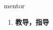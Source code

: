 
\begin{frame}
{\huge mentor}
\begin{center}
\begin{enumerate}\Large
  \item \textbf{教导，指导}
\end{enumerate}
\end{center}
\end{frame}
